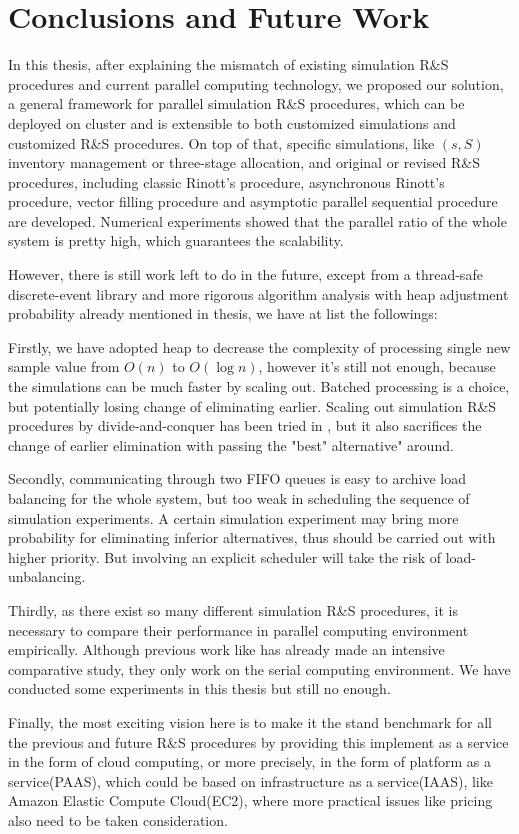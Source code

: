 \chapter{Conclusions and Future Work}

In this thesis, after explaining the mismatch of existing simulation R\&S procedures and current parallel computing technology, we proposed our solution, a general framework for parallel simulation R\&S procedures, which can be deployed on cluster and is extensible to both customized simulations and customized R\&S procedures. On top of that, specific simulations, like $(s, S)$ inventory management or three-stage allocation, and original or revised R\&S procedures, including classic Rinott's procedure, asynchronous Rinott's procedure, vector filling procedure and asymptotic parallel sequential procedure are developed. Numerical experiments showed that the parallel ratio of the whole system is pretty high, which guarantees the scalability.

However, there is still work left to do in the future, except from a thread-safe discrete-event library and more rigorous algorithm analysis with heap adjustment probability already mentioned in thesis, we have at list the followings:

Firstly, we have adopted heap to decrease the complexity of processing single new sample value from $O(n)$ to $O(\log{n})$, however it's still not enough, because the simulations can be much faster by scaling out. Batched processing is a choice, but potentially losing change of eliminating earlier. Scaling out simulation R\&S procedures by divide-and-conquer has been tried in \cite{potwsc05ras}, but it also sacrifices the change of earlier elimination with passing the "best" alternative" around.

Secondly, communicating through two FIFO queues is easy to archive load balancing for the whole system, but too weak in scheduling the sequence of simulation experiments. A certain simulation experiment may bring more probability for eliminating inferior alternatives, thus should be carried out with higher priority. But involving an explicit scheduler will take the risk of load-unbalancing.

Thirdly, as there exist so many different simulation R\&S procedures, it is necessary to compare their performance in parallel computing environment empirically. Although previous work like \cite{ms05ras} has already made an intensive comparative study, they only work on the serial computing environment. We have conducted some experiments in this thesis but still no enough.

Finally, the most exciting vision here is to make it the stand benchmark for all the previous and future R\&S procedures by providing this implement as a service in the form of cloud computing, or more precisely, in the form of platform as a service(PAAS), which could be based on infrastructure as a service(IAAS), like Amazon Elastic Compute Cloud(EC2), where more practical issues like pricing also need to be taken consideration.

